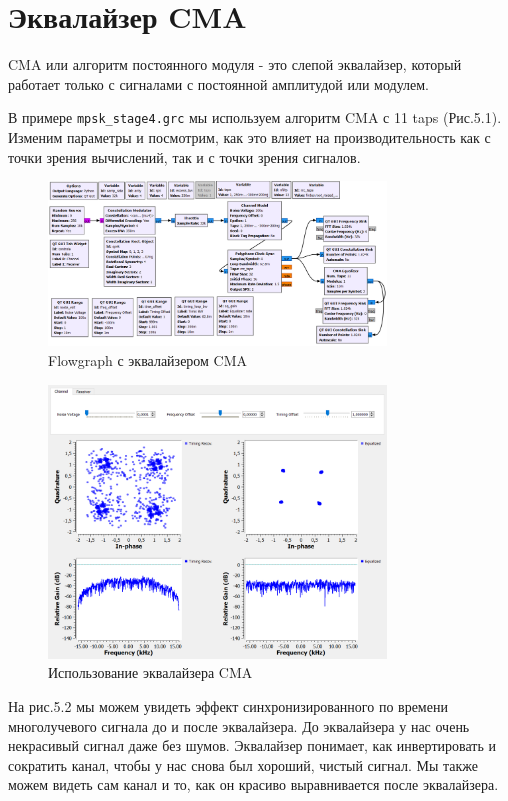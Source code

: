\documentclass[a4paper,12pt]{report}
\begin{document}
\section{Эквалайзер CMA}
    CMA или алгоритм постоянного модуля - это слепой эквалайзер, который работает только с сигналами с постоянной амплитудой или модулем.
    
    В примере \texttt{mpsk\_stage4.grc} мы используем алгоритм CMA с 11 taps (Рис.5.1). Изменим параметры и посмотрим, как это влияет на производительность как с точки зрения вычислений, так и с точки зрения сигналов.
\begin{figure}[H]
        \centering
        \includegraphics[width=0.8\textwidth]{fig5-1.PNG}
        \caption{Flowgraph с эквалайзером CMA}
        \label{fig:fig5-1}
\end{figure}
\begin{figure}[H]
        \centering
        \includegraphics[width=0.8\textwidth]{fig5-2.PNG}
        \caption{Использование эквалайзера CMA}
        \label{fig:fig5-2}
\end{figure}    
        
    На рис.5.2 мы можем увидеть эффект синхронизированного по времени многолучевого сигнала до и после эквалайзера. До эквалайзера у нас очень некрасивый сигнал даже без шумов. Эквалайзер понимает, как инвертировать и сократить канал, чтобы у нас снова был хороший, чистый сигнал. Мы также можем видеть сам канал и то, как он красиво выравнивается после эквалайзера. 
\end{document}

